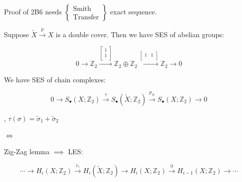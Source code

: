 \documentclass{article}
\theoremstyle{definition}
\begin{document}
    Proof of 2B6 needs \(\begin{Bmatrix}\text{Smith} \\ \text{Transfer} \end{Bmatrix}\) exact sequence.
    
    Suppose \(\widetilde{X} \xrightarrow{p} X\) is a double cover. Then we have SES of abelian groups:

    \[
        0 \to \mathbb{Z}_2 \xrightarrow{\begin{bmatrix}
            1 \\
            1 \\
        \end{bmatrix}} \mathbb{Z}_2\oplus \mathbb{Z}_2 \xrightarrow{\begin{bmatrix}
            1 & 1 \\
        \end{bmatrix}} \mathbb{Z}_2 \to 0
    \]

    We have SES of chain complexes:

    \[
        0 \to S_\bullet(X;\mathbb{Z}_2) \xrightarrow{\tau} S_\bullet(\widetilde{X};\mathbb{Z}_2) \xrightarrow{p_\#} S_\bullet(X;\mathbb{Z}_2) \to 0
    \]

    \begin{center}
        , \(\tau(\sigma) = \widetilde{\sigma }_1 + \widetilde{\sigma}_2\) 
    \end{center}

    \begin{center}
         \(\iff\) 
    \end{center}

    Zig-Zag lemma \(\implies\) LES:

    \[
        \cdots \to H_i(X;\mathbb{Z}_2) \xrightarrow{\tau_{\ast}} H_i(\widetilde{X};\mathbb{Z}_2) \to H_i(X;\mathbb{Z}_2) \xrightarrow{\partial} H_{i-1} (X;\mathbb{Z}_2) \to \cdots
    \]
\end{document}
